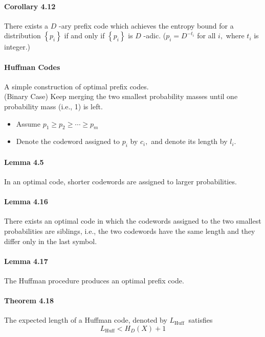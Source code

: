 \documentclass[8pt]{article}
\begin{document}
\paragraph{Corollary 4.12} There exists a $D$ -ary prefix code which achieves the entropy bound for a distribution $\left\{p_{i}\right\}$ if and only if $\left\{p_{i}\right\}$ is $D$ -adic. ($p_{i}=D^{-t_{i}}$ for all $i,$ where $t_{i}$ is integer.)

\paragraph{Huffman Codes} A simple construction of optimal prefix codes. \\
 (Binary Case) Keep merging the two smallest probability masses until one probability mass (i.e., 1) is left.
 
 \begin{itemize}
 	\item Assume $p_{1} \geq p_{2} \geq \cdots \geq p_{m}$
 	\item Denote the codeword assigned to $p_{i}$ by $c_{i},$ and denote its length by $l_{i}$.
 \end{itemize}

 \paragraph{Lemma 4.5} In an optimal code, shorter codewords are assigned to larger probabilities.
 
\paragraph{Lemma 4.16} There exists an optimal code in which the codewords assigned to the two smallest probabilities are siblings, i.e., the two codewords have the same length and they differ only in the last symbol.
\paragraph{Lemma 4.17} The Huffman procedure produces an optimal prefix code.

\begin{tcolorbox}
\paragraph{Theorem 4.18} The expected length of a Huffman code, denoted by $L_{\text {Huff }}$ satisfies
$$
L_{\mathrm{Huff}}<H_{D}(X)+1
$$
\end{tcolorbox}
\end{document}
